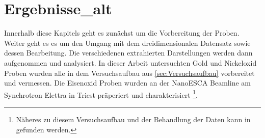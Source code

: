 \chapter{Ergebnisse_alt}
    Innerhalb diese Kapitels geht es zunächst um die Vorbereitung der Proben.
    Weiter geht es es um den Umgang mit dem dreidimensionalen Datensatz sowie dessen Bearbeitung.
    Die verschiedenen extrahierten Darstellungen werden dann aufgenommen und analysiert.
    In dieser Arbeit untersuchten Gold und Nickeloxid Proben wurden alle in dem Versuchsaufbau aus \autoref{sec:Versuchsaufbau} vorbereitet und vermessen.
    Die Eisenoxid Proben wurden an der NanoESCA Beamline am Synchrotron Elettra in Triest präperiert und charakterisiert \footnote{Näheres zu diesem Versuchsaufbau und der Behandlung der Daten kann in \cite{ma-DJ} gefunden werden.}.

